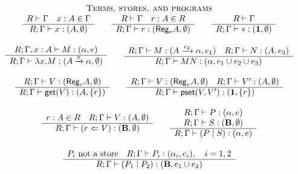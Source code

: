 \documentclass[11pt]{article}
\newcommand{\Gives}{\vdash}             \newcommand{\IGives}{\vdash_{I}}        \newcommand{\AIGives}{\vdash_{{\it AI}}} \newcommand{\CGives}{\vdash_{C}}
\newcommand{\behtype}{{\bf B}}
\newcommand{\infer}[2]{\begin{array}{c} #1 \\ \hline #2 \end{array}}
\newcommand{\act}[1]{\xrightarrow{#1}}
\newcommand{\set}[1]{\{#1\}}
\newcommand{\pst}[2]{{\sf pset}(#1,#2)}
\newcommand{\get}[1]{{\sf get}(#1)}
\newcommand{\pstore}[2]{(#1 \Leftarrow #2)}
\newcommand{\regtype}[2]{{\sf Reg}_{#1} #2}
\begin{document}
\begin{table}
{\[\begin{array}{c}
\\ \\


\mbox{{\sc Terms, stores, and programs}} \\ 

\infer{R\Gives \Gamma \quad x:A\in \Gamma}
{R;\Gamma\Gives x:(A,\emptyset)}

\qquad 
\infer{R\Gives \Gamma \quad r:A\in R}
{R;\Gamma\Gives r:(\regtype{r}{A},\emptyset)} 

\qquad
\infer{R\Gives \Gamma}
{R;\Gamma \Gives *: (\tertype,\emptyset)} \\ \\

\infer{R;\Gamma,x:A \Gives M: (\alpha,e)}
{R;\Gamma\Gives \lambda x.M :(A\act{e} \alpha,\emptyset)}

\qquad

\infer{R;\Gamma \Gives M: (A\act{e_{2}} \alpha ,e_{1}) \quad R;\Gamma\Gives N: (A,e_{3})}
{R;\Gamma \Gives MN :(\alpha,e_1\union e_2\union e_3)} \\ \\


\infer{R;\Gamma \Gives V: (\regtype{r}{A}, \emptyset)}
{R;\Gamma \Gives \get{V} : (A,\set{r})} 

\qquad

\infer{R;\Gamma \Gives V: (\regtype{r}{A}, \emptyset)\quad R;\Gamma \Gives V':(A,\emptyset)}
{R;\Gamma \Gives \pst{V}{V'} : (\tertype, \set{r})} \\ \\ 


\infer{r:A \in R \quad R;\Gamma \Gives V: (A,\emptyset)}
{R;\Gamma \Gives \pstore{r}{V} :(\behtype,\emptyset)}

\qquad 

\infer{\begin{array}{c}
R;\Gamma \Gives P:(\alpha,e) \\
R;\Gamma \Gives S:(\behtype,\emptyset)
\end{array}}
{R;\Gamma \Gives (P\mid S):(\alpha, e)}  


\\ \\
\infer{
P_i \mbox{ not a store} \quad 
R;\Gamma \Gives P_i:(\alpha_i,e_i), \quad i=1,2
}
{R;\Gamma \Gives (P_1\mid P_2):(\behtype,e_1\union e_2)}  


\end{array}
\]}
\caption{Intuitionistic system: stratified types and effects}\label{summary2}
\end{table}
\end{document}
